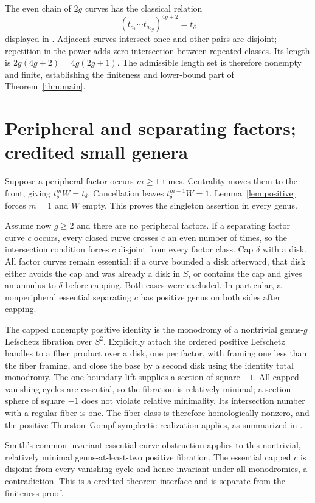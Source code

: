 \documentclass[11pt]{article}
\begin{document}
The even chain of $2g$ curves has the classical relation
\[
(t_{a_1}\cdots t_{a_{2g}})^{4g+2}=t_\delta
\]
displayed in \cite[printed p.~125, relation (3)]{W}. Adjacent curves intersect once and other pairs are disjoint; repetition in the power adds zero intersection between repeated classes. Its length is $2g(4g+2)=4g(2g+1)$. The admissible length set is therefore nonempty and finite, establishing the finiteness and lower-bound part of Theorem~\ref{thm:main}.

\section{Peripheral and separating factors; credited small genera}
Suppose a peripheral factor occurs $m\geq1$ times. Centrality moves them to the front, giving $t_\delta^m W=t_\delta$. Cancellation leaves $t_\delta^{m-1}W=1$. Lemma~\ref{lem:positive} forces $m=1$ and $W$ empty. This proves the singleton assertion in every genus.

Assume now $g\geq2$ and there are no peripheral factors. If a separating factor curve $c$ occurs, every closed curve crosses $c$ an even number of times, so the intersection condition forces $c$ disjoint from every factor class. Cap $\delta$ with a disk. All factor curves remain essential: if a curve bounded a disk afterward, that disk either avoids the cap and was already a disk in $S$, or contains the cap and gives an annulus to $\delta$ before capping. Both cases were excluded. In particular, a nonperipheral essential separating $c$ has positive genus on both sides after capping.

The capped nonempty positive identity is the monodromy of a nontrivial genus-$g$ Lefschetz fibration over $S^2$. Explicitly attach the ordered positive Lefschetz handles to a fiber product over a disk, one per factor, with framing one less than the fiber framing, and close the base by a second disk using the identity total monodromy. The one-boundary lift supplies a section of square $-1$. All capped vanishing cycles are essential, so the fibration is relatively minimal; a section sphere of square $-1$ does not violate relative minimality. Its intersection number with a regular fiber is one. The fiber class is therefore homologically nonzero, and the positive Thurston--Gompf symplectic realization applies, as summarized in \cite[PDF p.~1]{S}.

Smith's common-invariant-essential-curve obstruction \cite[Theorem 1.3, Proposition 4.2 and Corollary 4.3]{S} applies to this nontrivial, relatively minimal genus-at-least-two positive fibration. The essential capped $c$ is disjoint from every vanishing cycle and hence invariant under all monodromies, a contradiction. This is a credited theorem interface and is separate from the finiteness proof.
\end{document}
